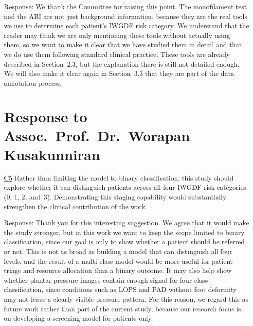 \documentclass[12pt,a4paper]{article}
\newcommand{\cid}[1]{{\color{cidred}\underline{#1}}}
\newcommand{\mref}[1]{%
  \marginnote{%
    \color{respblue}\scriptsize
    \rule[-0.3ex]{0.6pt}{1.4ex}\hspace{4pt}%
    \parbox[t]{2.4cm}{\raggedright #1}%
  }%
}
\newenvironment{response}{%
  \par\color{respblue}%
}{\par}
\begin{document}
\mref{\S~2.3\\[2pt]Clinical\\Assessment\\Methods\\[4pt]\S~3.3\\[2pt]Data\\Annotation}
\begin{response}
\underline{Response:} We thank the Committee for raising this point. The monofilament test and the ABI are not just background information, because they are the real tools we use to determine each patient's IWGDF risk category. We understand that the reader may think we are only mentioning these tools without actually using them, so we want to make it clear that we have studied them in detail and that we do use them following standard clinical practice. These tools are already described in Section~2.3, but the explanation there is still not detailed enough. We will also make it clear again in Section~3.3 that they are part of the data annotation process.
\end{response}

\section*{Response to Assoc.\ Prof.\ Dr.\ Worapan Kusakunniran}

\cid{C5} Rather than limiting the model to binary classification, this study should explore whether it can distinguish patients across all four IWGDF risk categories (0, 1, 2, and~3). Demonstrating this staging capability would substantially strengthen the clinical contribution of the work.

\mref{\S~1.3\\Research\\Question (RQ5)\\[4pt]\S~3.7\\Evaluation\\Plan}
\begin{response}
\underline{Response:} Thank you for this interesting suggestion. We agree that it would make the study stronger, but in this work we want to keep the scope limited to binary classification, since our goal is only to show whether a patient should be referred or not. This is not as broad as building a model that can distinguish all four levels, and the result of a multi-class model would be more useful for patient triage and resource allocation than a binary outcome. It may also help show whether plantar pressure images contain enough signal for four-class classification, since conditions such as LOPS and PAD without foot deformity may not leave a clearly visible pressure pattern. For this reason, we regard this as future work rather than part of the current study, because our research focus is on developing a screening model for patients only.
\end{response}
\end{document}
